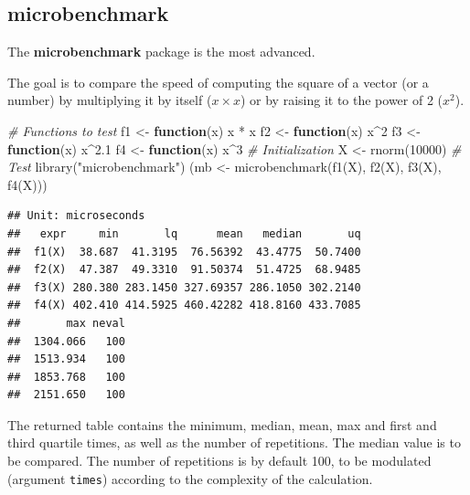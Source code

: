 \documentclass[
  12pt,
  american,
  a4paper,
  extrafontsizes,onecolumn,openright
  ]{memoir}
\newenvironment{Shaded}{\begin{snugshade}}{\end{snugshade}}
\newcommand{\CommentTok}[1]{\textcolor[rgb]{0.56,0.35,0.01}{\textit{#1}}}
\newcommand{\ControlFlowTok}[1]{\textcolor[rgb]{0.13,0.29,0.53}{\textbf{#1}}}
\newcommand{\DecValTok}[1]{\textcolor[rgb]{0.00,0.00,0.81}{#1}}
\newcommand{\FloatTok}[1]{\textcolor[rgb]{0.00,0.00,0.81}{#1}}
\newcommand{\FunctionTok}[1]{\textcolor[rgb]{0.00,0.00,0.00}{#1}}
\newcommand{\NormalTok}[1]{#1}
\newcommand{\OtherTok}[1]{\textcolor[rgb]{0.56,0.35,0.01}{#1}}
\newcommand{\SpecialCharTok}[1]{\textcolor[rgb]{0.00,0.00,0.00}{#1}}
\newcommand{\StringTok}[1]{\textcolor[rgb]{0.31,0.60,0.02}{#1}}
\begin{document}
\normalsize

\hypertarget{microbenchmark}{%
\subsection{microbenchmark}\label{microbenchmark}}

The \textbf{microbenchmark} package is the most advanced.

The goal is to compare the speed of computing the square of a vector (or a number) by multiplying it by itself (\(x \times x\)) or by raising it to the power of 2 (\(x^2\)).

\scriptsize

\begin{Shaded}
\begin{Highlighting}[]
\CommentTok{\# Functions to test}
\NormalTok{f1 }\OtherTok{\textless{}{-}} \ControlFlowTok{function}\NormalTok{(x) x }\SpecialCharTok{*}\NormalTok{ x}
\NormalTok{f2 }\OtherTok{\textless{}{-}} \ControlFlowTok{function}\NormalTok{(x) x}\SpecialCharTok{\^{}}\DecValTok{2}
\NormalTok{f3 }\OtherTok{\textless{}{-}} \ControlFlowTok{function}\NormalTok{(x) x}\SpecialCharTok{\^{}}\FloatTok{2.1}
\NormalTok{f4 }\OtherTok{\textless{}{-}} \ControlFlowTok{function}\NormalTok{(x) x}\SpecialCharTok{\^{}}\DecValTok{3}
\CommentTok{\# Initialization}
\NormalTok{X }\OtherTok{\textless{}{-}} \FunctionTok{rnorm}\NormalTok{(}\DecValTok{10000}\NormalTok{)}
\CommentTok{\# Test}
\FunctionTok{library}\NormalTok{(}\StringTok{"microbenchmark"}\NormalTok{)}
\NormalTok{(mb }\OtherTok{\textless{}{-}} \FunctionTok{microbenchmark}\NormalTok{(}\FunctionTok{f1}\NormalTok{(X), }\FunctionTok{f2}\NormalTok{(X), }\FunctionTok{f3}\NormalTok{(X), }\FunctionTok{f4}\NormalTok{(X)))}
\end{Highlighting}
\end{Shaded}

\begin{verbatim}
## Unit: microseconds
##   expr     min       lq      mean   median       uq
##  f1(X)  38.687  41.3195  76.56392  43.4775  50.7400
##  f2(X)  47.387  49.3310  91.50374  51.4725  68.9485
##  f3(X) 280.380 283.1450 327.69357 286.1050 302.2140
##  f4(X) 402.410 414.5925 460.42282 418.8160 433.7085
##       max neval
##  1304.066   100
##  1513.934   100
##  1853.768   100
##  2151.650   100
\end{verbatim}

\normalsize

The returned table contains the minimum, median, mean, max and first and third quartile times, as well as the number of repetitions.
The median value is to be compared.
The number of repetitions is by default 100, to be modulated (argument \texttt{times}) according to the complexity of the calculation.
\end{document}
